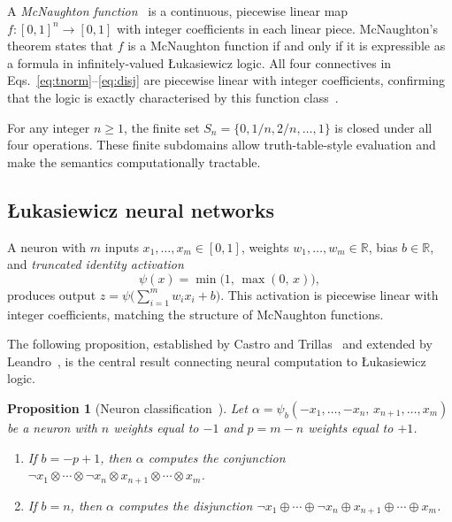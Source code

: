 \documentclass[12pt,a4paper]{article}
\newtheorem{proposition}[theorem]{Proposition}
\newcommand{\tnorm}{\otimes}      %
\newcommand{\disj}{\oplus}        %
\begin{document}
A \emph{McNaughton function}~\cite{mcnaughton1951} is a continuous, piecewise
linear map $f\colon [0,1]^n \to [0,1]$ with integer coefficients in each linear
piece.
McNaughton's theorem states that $f$ is a McNaughton function if and only if
it is expressible as a formula in infinitely-valued \L{}ukasiewicz logic.
All four connectives in Eqs.~\eqref{eq:tnorm}--\eqref{eq:disj} are
piecewise linear with integer coefficients, confirming that the logic is
exactly characterised by this function class~\cite{mundici1986}.

For any integer $n \geq 1$, the finite set
$S_n = \{0, 1/n, 2/n, \ldots, 1\}$ is closed under all four operations.
These finite subdomains allow truth-table-style evaluation and make the
semantics computationally tractable.

\subsection{\L{}ukasiewicz neural networks}
\label{ssec:lnn}

A neuron with $m$ inputs $x_1, \ldots, x_m \in [0,1]$, weights
$w_1, \ldots, w_m \in \mathbb{R}$, bias $b \in \mathbb{R}$, and
\emph{truncated identity activation}
\begin{equation}
  \psi(x) = \min\!\bigl(1,\, \max(0,\, x)\bigr),
  \label{eq:psi}
\end{equation}
produces output $z = \psi\!\bigl(\sum_{i=1}^m w_i x_i + b\bigr)$.
This activation is piecewise linear with integer coefficients, matching the
structure of McNaughton functions.

The following proposition, established by Castro and
Trillas~\cite{castro1998} and extended by Leandro~\cite{leandro2009},
is the central result connecting neural computation to \L{}ukasiewicz logic.

\begin{proposition}[Neuron classification~\cite{castro1998,leandro2009}]
\label{prop:classif}
Let $\alpha = \psi_b(-x_1, \ldots, -x_n,\, x_{n+1}, \ldots, x_m)$
be a neuron with $n$ weights equal to $-1$ and $p = m - n$ weights equal to
$+1$.
\begin{enumerate}
  \item If $b = -p + 1$, then $\alpha$ computes the \emph{conjunction}
    $\neg x_1 \tnorm \cdots \tnorm \neg x_n \tnorm x_{n+1}
     \tnorm \cdots \tnorm x_m$.
  \item If $b = n$, then $\alpha$ computes the \emph{disjunction}
    $\neg x_1 \disj \cdots \disj \neg x_n \disj x_{n+1}
     \disj \cdots \disj x_m$.
\end{enumerate}
\end{proposition}
\end{document}
